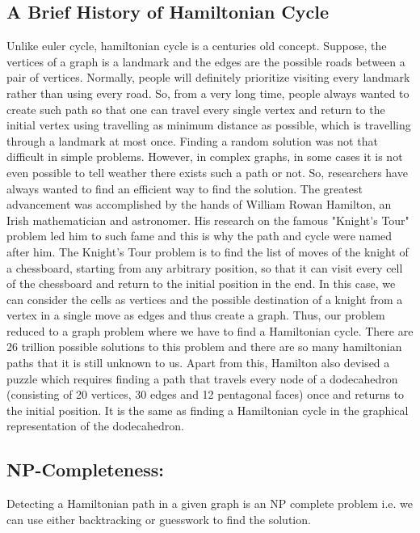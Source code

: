 \documentclass[14pt, times, a4paper]{extarticle}
\begin{document}
\subsection{A Brief History of Hamiltonian Cycle}
Unlike euler cycle, hamiltonian cycle is a centuries old concept. Suppose, the vertices of a graph is a landmark and the edges are the possible roads between a pair of vertices. Normally, people will definitely prioritize visiting every landmark rather than using every road. So, from a very long time, people always wanted to create such path so that one can travel every single vertex and return to the initial vertex using travelling as minimum distance as possible, which is travelling through a landmark at most once. Finding a random solution was not that difficult in simple problems. However, in complex graphs, in some cases it is not even possible to tell weather there exists such a path or not. So, researchers have always wanted to find an efficient way to find the solution.
The greatest advancement was accomplished by the hands of William Rowan Hamilton, an Irish mathematician and astronomer. His research on the famous "\gls{Knight's Tour}" problem led him to such fame and this is why the path and cycle were named after him. The Knight's Tour problem is to find the list of moves of the knight of a chessboard, starting from any arbitrary position, so that it can visit every cell of the chessboard and return to the initial position in the end. In this case, we can consider the cells as vertices and the possible destination of a knight from a vertex in a single move as edges and thus create a graph. Thus, our problem reduced to a graph problem where we have to find a Hamiltonian cycle. There are 26 trillion possible solutions to this problem and there are so many hamiltonian paths that it is still unknown to us.
Apart from this, Hamilton also devised a puzzle which requires finding a path that travels every node of a dodecahedron (consisting of 20 vertices, 30 edges and 12 pentagonal faces) once and returns to the initial position. It is the same as finding a Hamiltonian cycle in the graphical representation of the dodecahedron.  \cite{numberphile}


\subsection{NP-Completeness:} Detecting a Hamiltonian path in a given graph is an NP complete problem i.e. we can use either backtracking or guesswork to find the solution.
\end{document}

